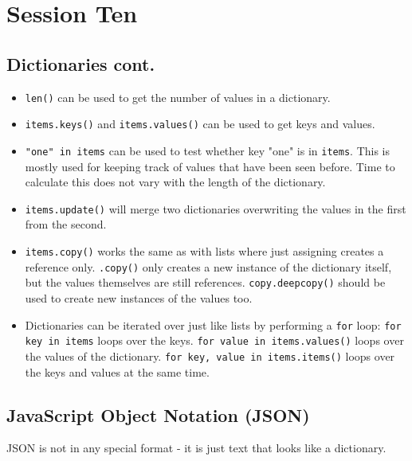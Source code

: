 \section{Session Ten}\label{sec:session_ten}

\subsection{Dictionaries cont.}\label{sub:dictionaries_cont_}

\begin{itemize}
    \item \texttt{len()} can be used to get the number of values in a dictionary.
    \item \texttt{items.keys()} and \texttt{items.values()} can be used to get keys and values.
    \item \texttt{"one" in items} can be used to test whether key "one" is in \texttt{items}.
          This is mostly used for keeping track of values that have been seen before.
          Time to calculate this does not vary with the length of the dictionary.
    \item \texttt{items.update()} will merge two dictionaries overwriting the values in the first from the second.
    \item \texttt{items.copy()} works the same as with lists where just assigning creates a reference only.
          \texttt{.copy()} only creates a new instance of the dictionary itself, but the values themselves are still references.
          \texttt{copy.deepcopy()} should be used to create new instances of the values too.
    \item Dictionaries can be iterated over just like lists by performing a \texttt{for} loop:
          \texttt{for key in items} loops over the keys.
          \texttt{for value in items.values()} loops over the values of the dictionary.
          \texttt{for key, value in items.items()} loops over the keys and values at the same time.
\end{itemize}

\subsection{JavaScript Object Notation (JSON)}\label{sub:javascript_object_notation_json_}

JSON is not in any special format - it is just text that looks like a dictionary.

